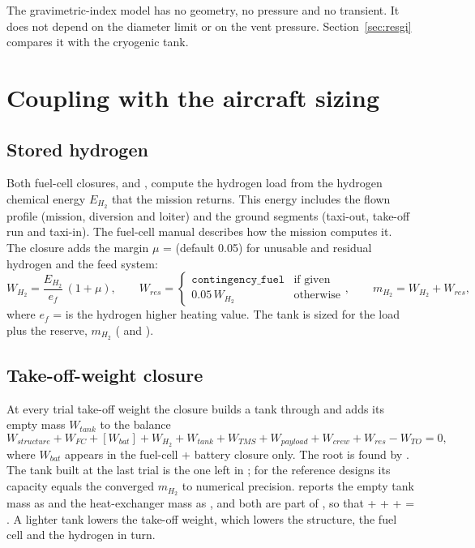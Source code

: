 \documentclass[a4paper,11pt]{article}
\begin{document}
The gravimetric-index model has no geometry, no pressure and no transient. It does not depend
on the diameter limit or on the vent pressure. Section~\ref{sec:resgi} compares it with the
cryogenic tank.

\section{Coupling with the aircraft sizing}\label{sec:coupling}

\subsection{Stored hydrogen}\label{sec:load}
Both fuel-cell closures,  and , compute the
hydrogen load from the hydrogen chemical energy $E_{H_2}$ that the mission returns. This energy
includes the flown profile (mission, diversion and loiter) and the ground segments (taxi-out,
take-off run and taxi-in). The fuel-cell manual describes how the mission computes it. The
closure adds the margin $\mu$ =  (default 0.05) for unusable
and residual hydrogen and the feed system:
\begin{equation}
  W_{H_2} = \frac{E_{H_2}}{e_f}\,(1 + \mu),
  \qquad
  W_{res} = \begin{cases} \texttt{contingency\_fuel} & \text{if given}\\ 0.05\,W_{H_2} & \text{otherwise}\end{cases},
  \qquad
  m_{H_2} = W_{H_2} + W_{res},
  \label{eq:load}
\end{equation}
where $e_f$ =  is the hydrogen higher heating value. The tank is sized for
the load plus the reserve, $m_{H_2}$ ( and ).

\subsection{Take-off-weight closure}
At every trial take-off weight the closure builds a tank through
 and adds its empty mass $W_{tank}$ to the balance
\begin{equation}
  W_{structure} + W_{FC} + [W_{bat}] + W_{H_2} + W_{tank} + W_{TMS} + W_{payload} + W_{crew} + W_{res} - W_{TO} = 0,
\end{equation}
where $W_{bat}$ appears in the fuel-cell + battery closure only. The root is found by
. The tank built at the last trial is the one left in
; for the reference designs its capacity equals the converged
$m_{H_2}$ to numerical precision.  reports the empty tank mass as
 and the heat-exchanger mass as , and both are part of
, so that  +  +  +
 = . A lighter tank lowers the take-off weight, which lowers the
structure, the fuel cell and the hydrogen in turn.
\end{document}
